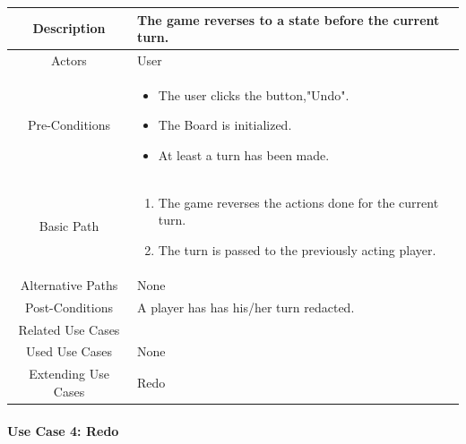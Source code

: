 \documentclass[10pt, a4paper]{article}
\begin{document}
	\begin{center}
		\begin{tabular}{ |c|p{10cm}| } 
			\hline
			Description & The game reverses to a state before the current turn. \\
			\hline 
			Actors & User \\
			\hline  
			Pre-Conditions & \begin{itemize}[noitemsep,topsep=0pt]
				\item The user clicks the button,"Undo".
				\item The Board is initialized.
				\item At least a turn has been made.
			\end{itemize} \\
			\hline  
			Basic Path & 
			\begin{enumerate}
				\item The game reverses the actions done for the current turn.
				\item The turn is passed to the previously acting player.
			\end{enumerate}\\
			\hline
			Alternative Paths & None \\
			\hline
			Post-Conditions & A player has has his/her turn redacted.\\
			\hline 
			Related Use Cases & \\
			\hline 
			Used Use Cases & None\\
			\hline 
			Extending Use Cases & Redo \\
			\hline 
		\end{tabular}
	\end{center}
	
	\newpage
	
	\paragraph{Use Case 4: Redo}
	
\end{document}
